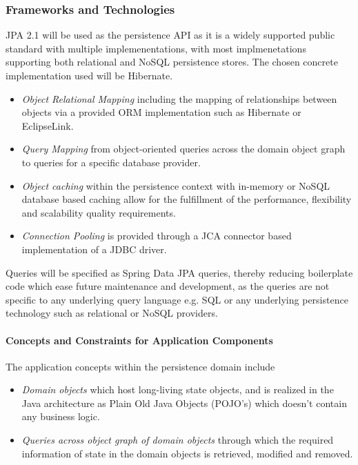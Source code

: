 \subsubsection{Frameworks and Technologies}
JPA 2.1 will be used as the persistence API as it is a widely supported public
standard with multiple implemenentations, with most implmenetations supporting
both relational and NoSQL persistence stores. The chosen concrete implementation
used will be Hibernate.

\begin{itemize}
	\item \textit{Object Relational Mapping} including the mapping of
		relationships between objects via a provided ORM
		implementation such as Hibernate or EclipseLink.
	\item \textit{Query Mapping} from object-oriented queries across the
		domain object graph to queries for a specific database provider.
	\item \textit{Object caching} within the persistence context with
		in-memory or NoSQL database based caching allow for the
		fulfillment of the performance, flexibility and scalability
		quality requirements.
	\item \textit{Connection Pooling} is provided through a JCA connector
		based implementation of a JDBC driver.
\end{itemize}

Queries will be specified as Spring Data JPA queries, thereby reducing
boilerplate code which ease future maintenance and development, as the queries
are not specific to any underlying query language e.g. SQL or any underlying
persistence technology such as relational or NoSQL providers.

\paragraph{Concepts and Constraints for Application Components}
The application concepts within the persistence domain include
\begin{itemize}
	\item \textit{Domain objects} which host long-living state objects, and is realized in the Java architecture as Plain Old Java Objects (POJO's) which doesn't contain any business logic.
	\item \textit{Queries across object graph of domain objects} through which the required information of state in the domain objects is retrieved, modified and removed.
\end{itemize}
